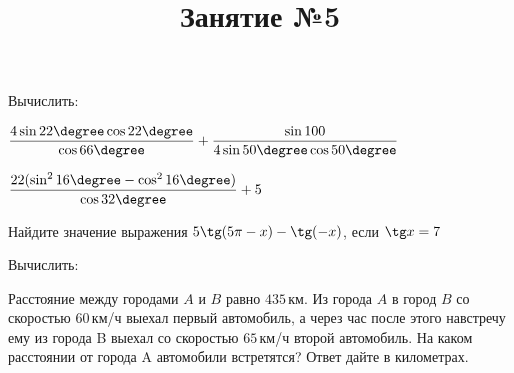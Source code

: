 \begin{listofex}
	\item Вычислить:
	\begin{enumcols}[itemcolumns=2]
		\item \( \dfrac{4\sin22\degree\cos22\degree}{\cos66\degree}+\dfrac{\sin100}{4\sin50\degree\cos50\degree} \)
		\item \( \dfrac{22(\sin^2 16\degree-\cos^2 16\degree)}{\cos32\degree}+5 \)
	\end{enumcols}
	\item Найдите значение выражения \( 5\tg(5\pi-x)-\tg(-x) \), если \( \tg x = 7 \)
	\item Вычислить:
	\begin{enumcols}[itemcolumns=4]
		\item {}
		\item {}
		\item {}
		\item {}
		\item {}
	\end{enumcols}
	\item Расстояние между городами \( A \) и \( B \) равно \( 435 \) км. Из города \( A \) в город \( B \) со скоростью \( 60 \) км/ч выехал первый автомобиль, а через час после этого навстречу ему из города B выехал со скоростью \( 65 \) км/ч второй автомобиль. На каком расстоянии от города A автомобили встретятся? Ответ дайте в километрах.
\end{listofex}
\newpage
\title{Занятие №5}
